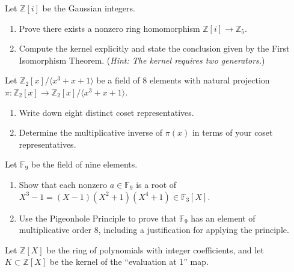 \documentclass[11pt,twoside,openany]{memoir}
\begin{document}
    \begin{exercise}
    Let $\mathbb{Z}[i]$ be the Gaussian integers.
    \begin{enumerate}[label=(\alph*)]
        \item Prove there exists a nonzero ring homomorphism $\mathbb{Z}[i]\to \mathbb{Z}_5$.
        \item Compute the kernel explicitly and state the conclusion given by the First Isomorphism Theorem. (\textit{Hint: The kernel requires two generators.})
    \end{enumerate}
    \end{exercise}
    
    \begin{exercise}
    Let $\mathbb{Z}_2[x]/\langle x^3+x+1\rangle$ be a field of 8 elements with natural projection $\pi:\mathbb{Z}_2[x]\to \mathbb{Z}_2[x]/\langle x^3+x+1\rangle$.
    \begin{enumerate}[label=(\alph*)]
        \item Write down eight distinct coset representatives.
        \item Determine the multiplicative inverse of $\pi(x)$ in terms of your coset representatives.
    \end{enumerate}
    \end{exercise}
    
    \begin{exercise}
    Let $\mathbb{F}_9$ be the field of nine elements.
    \begin{enumerate}[label=(\alph*)]
        \item Show that each nonzero $a\in \mathbb{F}_9$ is a root of $X^3-1=(X-1)(X^2+1)(X^4+1)\in \mathbb{F}_3[X]$.
        \item Use the Pigeonhole Principle to prove that $\mathbb{F}_9$ has an element of multiplicative order 8, including a justification for applying the principle.
    \end{enumerate}
    \end{exercise}
    
    \begin{exercise}
    Let $\mathbb{Z}[X]$ be the ring of polynomials with integer coefficients, and let $K\subset \mathbb{Z}[X]$ be the kernel of the ``evaluation at 1'' map.
    \end{exercise}
    
\end{document}
